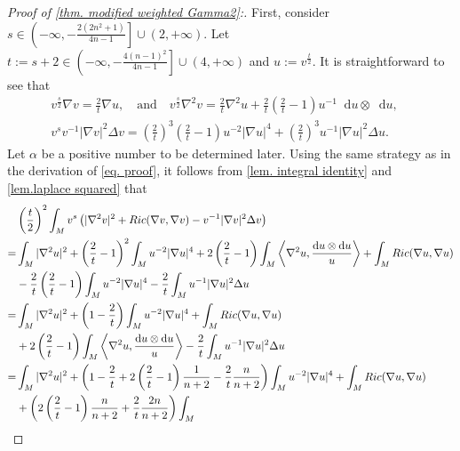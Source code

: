 \documentclass[10pt,a4paper]{amsart}
\newcommand{\dd}{\mathop{}\!\mathrm{d}}%
\begin{document}
        \begin{proof}[Proof of \cref{thm. modified weighted Gamma2}:]
     First, consider $s\in\left(-\infty,-\frac{2(2n^2+1)}{4n-1}\right]\cup(2,+\infty)$. Let $t:=s+2\in\left(-\infty,-\frac{4(n-1)^2}{4n-1}\right]\cup(4,+\infty)$ and $u:=v^{\frac{t}{2}}$. It is straightforward to see that
 \begin{align*}
        v^{\frac{s}{2}} \nabla v
        =\frac{2}{t}\nabla u,\quad \text{and}\quad
        v^{\frac{s}{2}}\nabla^2v
        =\frac{2}{t}\nabla^2 u+
        \frac{2}{t}\left(\frac{2}{t}-1\right)
        u^{-1}\dd u\otimes \dd u
        ,\quad 
        \\
        v^sv^{-1}|\nabla v|^2\Delta v
        =\left(\frac{2}{t}\right)^3\left(\frac{2}{t}-1\right)u^{-2}|\nabla u|^4
        +\left(\frac{2}{t}\right)^3u^{-1}|\nabla u|^2\Delta u.
 \end{align*}
 Let $\alpha $ be a positive number to be determined later. Using the same strategy as in the derivation of \cref{eq. proof}, it follows from \cref{lem. integral identity} and \cref{lem.laplace squared} that
 \begin{align}
     & \left(\frac{t}{2}\right)^2
     \int_{M} v^s
     \left(|\nabla^2 v|^2
     +Ric(\nabla v,\nabla v)
     -v^{-1}|\nabla v|^2\Delta v
     \right)\notag\\
     =&\int_M |\nabla^2 u|^2
     +\left(\frac{2}{t}-1\right)^2\int_Mu^{-2}|\nabla u|^4
     +2\left(\frac{2}{t}-1\right)\int_M
     \left\langle\nabla^2 u,\frac{\dd u\otimes\dd u}{u}\right\rangle
     +\int_M Ric(\nabla u,\nabla u)\notag\\
     &-\frac{2}{t}\left(\frac{2}{t}-1\right)\int_M
     u^{-2}|\nabla u|^4
     -\frac{2}{t}\int_M
     u^{-1}|\nabla u|^2\Delta u\notag\\
     =&\int_M|\nabla^2 u|^2
     +\left(1-\frac{2}{t}\right)\int_M
     u^{-2}|\nabla u|^4
     +\int_M Ric(\nabla u,\nabla u)
     \notag\\
     &+2\left(\frac{2}{t}-1\right)\int_M
     \left\langle\nabla^2 u,\frac{\dd u\otimes\dd u}{u}\right\rangle
     -\frac{2}{t}\int_M
     u^{-1}|\nabla u|^2\Delta u
     \notag\\
     =&\int_M |\nabla^2 u|^2
     +\left(1-\frac{2}{t}+2\left(\frac{2}{t}-1\right)\frac{1}{n+2}
     -\frac{2}{t}\frac{n}{n+2}\right)\int_M
     u^{-2}|\nabla u|^4
     +\int_M Ric(\nabla u,\nabla u)\notag\\
     &+\left(
     2\left(\frac{2}{t}-1\right)\frac{n}{n+2}
     +\frac{2}{t}\frac{2n}{n+2}
     \right)\int_M

\end{align}
\end{proof}
\end{document}
